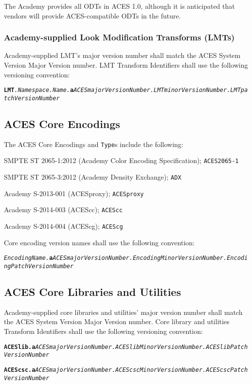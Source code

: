 The Academy provides all ODTs in ACES 1.0, although it is anticipated that vendors will provide ACES-compatible ODTs in the future.

\subsubsection{Academy-supplied Look Modification Transforms (LMTs)}
Academy-supplied LMT's major version number shall match the ACES System Version Major Version number. LMT Transform Identifiers shall use the following versioning convention:

{\fontsize{8.5pt}{10.2pt}\selectfont
\texttt{\textbf{LMT}\textit{.Namespace.Name.\-}\textbf{a}\textit{ACESmajorVersionNumber.\-LMTminorVersionNumber.\-LMTpatch\-VersionNumber}}}

\subsection{ACES Core Encodings}
The ACES Core Encodings and \texttt{Type}s include the following:

\begin{listize}[-]
	\item SMPTE ST 2065-1:2012 (Academy Color Encoding Specification); \texttt{ACES2065-1}
	\item SMPTE ST 2065-3:2012 (Academy Density Exchange); \texttt{ADX}
	\item Academy S-2013-001 (ACESproxy); \texttt{ACESproxy}
	\item Academy S-2014-003 (ACEScc); \texttt{ACEScc} 
	\item Academy S-2014-004 (ACEScg); \texttt{ACEScg}
\end{listize}

Core encoding version names shall use the following convention:

{\fontsize{8pt}{9.6pt}\selectfont
\texttt{\textit{EncodingName.\-}\textbf{a}\textit{ACESmajorVersionNumber.\-EncodingMinorVersionNumber.\-Encoding\-PatchVersionNumber}} }

\subsection{ACES Core Libraries and Utilities}
Academy-supplied core libraries and utilities' major version number shall match the ACES System Version Major Version number. Core library and utilities Transform Identifiers shall use the following versioning convention:

{\fontsize{8.5pt}{12pt}\selectfont
\texttt{\textbf{ACESlib.a}\textit{ACESmajorVersionNumber.ACESlibMinorVersionNumber.ACESlib\-Patch\-Version\-Number}}

\texttt{\textbf{ACEScsc.a}\textit{ACESmajorVersionNumber.ACEScscMinorVersionNumber.ACEScsc\-Patch\-Version\-Number}}
}

